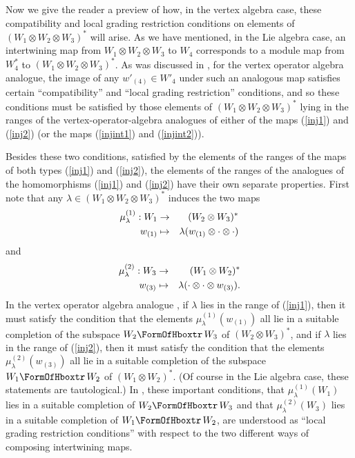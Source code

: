 \documentclass[12pt]{article}
\begin{document}
Now we give the reader a preview of how, in the vertex algebra case,
these compatibility and local grading restriction conditions on
elements of $(W_1\otimes W_2\otimes W_3)^*$ will arise.  As we have
mentioned, in the Lie algebra case, an intertwining map {}from
$W_1\otimes W_2 \otimes W_3$ to $W_4$ corresponds to a module map {}from
$W^*_4$ to $(W_1\otimes W_2\otimes W_3)^*$.  As was discussed in
\cite{tensor4}, for the vertex operator algebra analogue, the image of
any $w'_{(4)}\in W'_4$ under such an analogous map satisfies certain
``compatibility'' and ``local grading restriction'' conditions, and so
these conditions must be satisfied by those elements of $(W_1\otimes
W_2\otimes W_3)^*$ lying in the ranges of the vertex-operator-algebra
analogues of either of the maps (\ref{inj1}) and (\ref{inj2}) (or the
maps (\ref{injint1}) and (\ref{injint2})).

Besides these two conditions, satisfied by the elements of the ranges
of the maps of both types (\ref{inj1}) and (\ref{inj2}), the elements
of the ranges of the analogues of the homomorphisms (\ref{inj1}) and
(\ref{inj2}) have their own separate properties.  First note that any
$\lambda\in (W_1\otimes W_2\otimes W_3)^*$ induces the two maps
\begin{eqnarray}\label{mu1}
\mu^{(1)}_\lambda: W_1 &\to & (W_2\otimes W_3)^*\nonumber\\
 w_{(1)}&\mapsto & \lambda(w_{(1)} \otimes \cdot \otimes \cdot)
\end{eqnarray}
and
\begin{eqnarray}\label{mu2}
\mu^{(2)}_\lambda: W_3 &\to & (W_1\otimes W_2)^*\nonumber\\
w_{(3)}& \mapsto &\lambda(\cdot \otimes \cdot \otimes w_{(3)}).
\end{eqnarray}
In the vertex operator algebra analogue \cite{tensor4}, if $\lambda$
lies in the range of (\ref{inj1}), then it must satisfy the condition
that the elements $\mu^{(1)}_\lambda(w_{(1)})$ all lie in a suitable
completion of the subspace $W_2\hboxtr\, W_3$ of $(W_2\otimes W_3)^*$,
and if $\lambda$ lies in the range of (\ref{inj2}), then it must
satisfy the condition that the elements $\mu^{(2)}_\lambda(w_{(3)})$
all lie in a suitable completion of the subspace $W_1\hboxtr\, W_2$ of
$(W_1\otimes W_2)^*$.  (Of course in the Lie algebra case, these
statements are tautological.)  In \cite{tensor4}, these important
conditions, that $\mu^{(1)}_\lambda(W_1)$ lies in a suitable
completion of $W_2\hboxtr\, W_3$ and that $\mu^{(2)}_\lambda(W_3)$
lies in a suitable completion of $W_1\hboxtr\, W_2$, are understood as
``local grading restriction conditions'' with respect to the two
different ways of composing intertwining maps.
\end{document}
